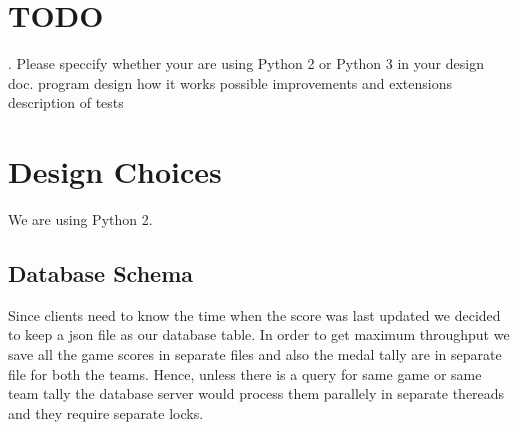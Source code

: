 \documentclass{article}
\begin{document}
\section{TODO}
. Please speccify whether your are using Python 2 or Python 3 in your design doc.
program design 
how it works
possible improvements and extensions
description of tests

\section{Design Choices}
We are using Python 2.

\subsection{Database Schema}
Since clients need to know the time when the score was last updated we decided to keep a json file as our database table. In order to get maximum throughput we save all the game scores in separate files and also the medal tally are in separate file for both the teams. Hence, unless there is a query for same game or same team tally the database server would process them parallely in separate thereads and they require separate locks.
\end{document}
